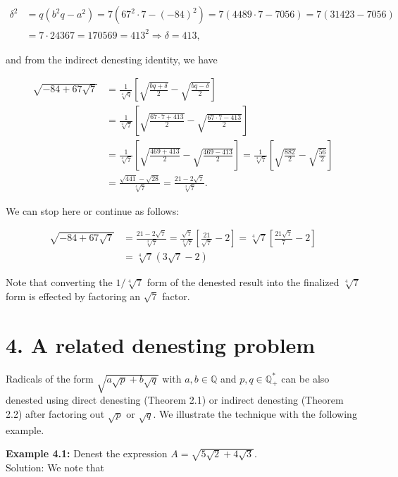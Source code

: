 \documentclass[11pt,letterpaper]{article}
\begin{document}
\[
\begin{aligned}
\delta^{2} & =q\left(b^{2} q-a^{2}\right)=7\left(67^{2} \cdot 7-(-84)^{2}\right)=7(4489 \cdot 7-7056)=7(31423-7056) \\
& =7 \cdot 24367=170569=413^{2} \Longrightarrow \delta=413,
\end{aligned}
\]

and from the indirect denesting identity, we have

\[
\begin{aligned}
\sqrt{-84+67 \sqrt{7}} & =\frac{1}{\sqrt[4]{q}}\left[\sqrt{\frac{b q+\delta}{2}}-\sqrt{\frac{b q-\delta}{2}}\right] \\
& =\frac{1}{\sqrt[4]{7}}\left[\sqrt{\frac{67 \cdot 7+413}{2}}-\sqrt{\frac{67 \cdot 7-413}{2}}\right] \\
& =\frac{1}{\sqrt[4]{7}}\left[\sqrt{\frac{469+413}{2}}-\sqrt{\frac{469-413}{2}}\right]=\frac{1}{\sqrt[4]{7}}\left[\sqrt{\frac{882}{2}}-\sqrt{\frac{56}{2}}\right] \\
& =\frac{\sqrt{441}-\sqrt{28}}{\sqrt[4]{7}}=\frac{21-2 \sqrt{7}}{\sqrt[4]{7}} .
\end{aligned}
\]

We can stop here or continue as follows:

\[
\begin{aligned}
\sqrt{-84+67 \sqrt{7}} & =\frac{21-2 \sqrt{7}}{\sqrt[4]{7}}=\frac{\sqrt{7}}{\sqrt[4]{7}}\left[\frac{21}{\sqrt{7}}-2\right]=\sqrt[4]{7}\left[\frac{21 \sqrt{7}}{7}-2\right] \\
& =\sqrt[4]{7}(3 \sqrt{7}-2)
\end{aligned}
\]

Note that converting the $1 / \sqrt[4]{7}$ form of the denested result into the finalized $\sqrt[4]{7}$ form is effected by factoring an $\sqrt{7}$ factor.

\section*{4. A related denesting problem}
Radicals of the form $\sqrt{a \sqrt{p}+b \sqrt{q}}$ with $a, b \in \mathbb{Q}$ and $p, q \in \mathbb{Q}_{+}^{*}$ can be also denested using direct denesting (Theorem 2.1) or indirect denesting (Theorem 2.2) after factoring out $\sqrt{p}$ or $\sqrt{q}$. We illustrate the technique with the following example.

\noindent\textbf{Example 4.1:} Denest the expression $A=\sqrt{5 \sqrt{2}+4 \sqrt{3}}$.\\
Solution: We note that
\end{document}
